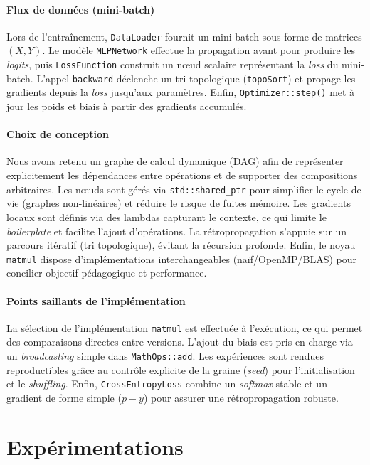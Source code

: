 \documentclass[a4paper,11pt]{article}
\begin{document}
\paragraph{Flux de données (mini-batch)}
Lors de l'entraînement, \texttt{DataLoader} fournit un mini-batch sous forme de matrices $(X, Y)$. Le modèle \texttt{MLPNetwork} effectue la propagation avant pour produire les \textit{logits}, puis \texttt{LossFunction} construit un nœud scalaire représentant la \textit{loss} du mini-batch. L'appel \texttt{backward} déclenche un tri topologique (\texttt{topoSort}) et propage les gradients depuis la \textit{loss} jusqu'aux paramètres. Enfin, \texttt{Optimizer::step()} met à jour les poids et biais à partir des gradients accumulés.

\paragraph{Choix de conception}
Nous avons retenu un graphe de calcul dynamique (DAG) afin de représenter explicitement les dépendances entre opérations et de supporter des compositions arbitraires. Les nœuds sont gérés via \texttt{std::shared\_ptr} pour simplifier le cycle de vie (graphes non-linéaires) et réduire le risque de fuites mémoire. Les gradients locaux sont définis via des lambdas capturant le contexte, ce qui limite le \textit{boilerplate} et facilite l'ajout d'opérations. La rétropropagation s'appuie sur un parcours itératif (tri topologique), évitant la récursion profonde. Enfin, le noyau \texttt{matmul} dispose d'implémentations interchangeables (naïf/OpenMP/BLAS) pour concilier objectif pédagogique et performance.

\paragraph{Points saillants de l'implémentation}
La sélection de l'implémentation \texttt{matmul} est effectuée à l'exécution, ce qui permet des comparaisons directes entre versions. L'ajout du biais est pris en charge via un \textit{broadcasting} simple dans \texttt{MathOps::add}. Les expériences sont rendues reproductibles grâce au contrôle explicite de la graine (\textit{seed}) pour l'initialisation et le \textit{shuffling}. Enfin, \texttt{CrossEntropyLoss} combine un \textit{softmax} stable et un gradient de forme simple ($p-y$) pour assurer une rétropropagation robuste.

\clearpage

\section{Expérimentations}
\end{document}
